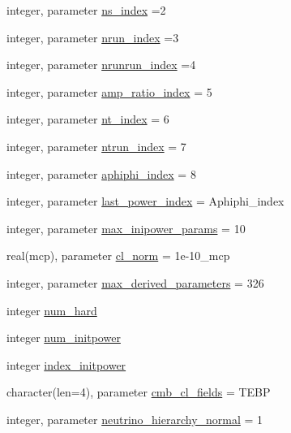 \begin{DoxyCompactItemize}
integer, parameter \mbox{\hyperlink{namespacecosmologytypes_a94ac6353d15b78b217f2ea727a13584f}{ns\+\_\+index}} =2
\item 
integer, parameter \mbox{\hyperlink{namespacecosmologytypes_ae7086a888c94e02609c59f8c5fa2dbf1}{nrun\+\_\+index}} =3
\item 
integer, parameter \mbox{\hyperlink{namespacecosmologytypes_ab8b99958a1c9ab51eb091e6e5aab271e}{nrunrun\+\_\+index}} =4
\item 
integer, parameter \mbox{\hyperlink{namespacecosmologytypes_a865a3713806fafe97fbe476029dc0387}{amp\+\_\+ratio\+\_\+index}} = 5
\item 
integer, parameter \mbox{\hyperlink{namespacecosmologytypes_a81146d2bca96d38cce3742a77963bca3}{nt\+\_\+index}} = 6
\item 
integer, parameter \mbox{\hyperlink{namespacecosmologytypes_a36ff14458bf8e280f350800fc8bd0ba7}{ntrun\+\_\+index}} = 7
\item 
integer, parameter \mbox{\hyperlink{namespacecosmologytypes_a702869d17ac6c53907a307832df04f5b}{aphiphi\+\_\+index}} = 8
\item 
integer, parameter \mbox{\hyperlink{namespacecosmologytypes_a12576036de0c90fcd196839ecf951a15}{last\+\_\+power\+\_\+index}} = Aphiphi\+\_\+index
\item 
integer, parameter \mbox{\hyperlink{namespacecosmologytypes_a777630dc8c977e6abd38f7a7cc4652b8}{max\+\_\+inipower\+\_\+params}} = 10
\item 
real(mcp), parameter \mbox{\hyperlink{namespacecosmologytypes_a5f2058a68678c051e4768dd4dc91203b}{cl\+\_\+norm}} = 1e-\/10\+\_\+mcp
\item 
integer, parameter \mbox{\hyperlink{namespacecosmologytypes_a6d02c6eb605923549777001d9c6144ad}{max\+\_\+derived\+\_\+parameters}} = 326
\item 
integer \mbox{\hyperlink{namespacecosmologytypes_a570495f7e1339d51d190e98980c9b01b}{num\+\_\+hard}}
\item 
integer \mbox{\hyperlink{namespacecosmologytypes_aab2abf3c84749a23d7bcd331d20deacb}{num\+\_\+initpower}}
\item 
integer \mbox{\hyperlink{namespacecosmologytypes_abb690edf45f7746cb6d70d0ee85c57a1}{index\+\_\+initpower}}
\item 
character(len=4), parameter \mbox{\hyperlink{namespacecosmologytypes_a59f0f294178f05545934eb7dd63928b6}{cmb\+\_\+cl\+\_\+fields}} = \textquotesingle{}T\+E\+BP\textquotesingle{}
\item 
integer, parameter \mbox{\hyperlink{namespacecosmologytypes_ac77eac54651ec04a99342a063e413398}{neutrino\+\_\+hierarchy\+\_\+normal}} = 1

\end{DoxyCompactItemize}
